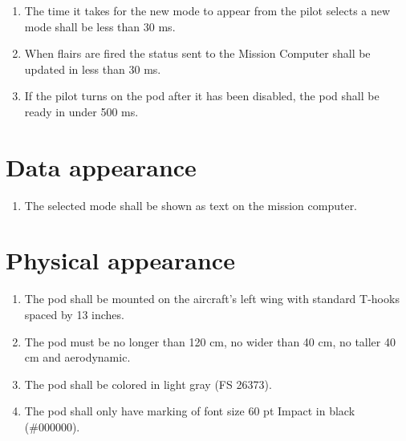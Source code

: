 \documentclass[Main]{subfiles}
\begin{document}
\begin{enumerate}[label= DDD-2.\arabic*:]

\item The time it takes for the new mode to appear from the pilot selects a new mode shall be less than 30 ms.\label{DDD-21}

\item When flairs are fired the status sent to the Mission Computer shall be updated in less than 30 ms.\label{DDD-22}

\item If the pilot turns on the pod after it has been disabled, the pod shall be ready in under 500 ms.\label{DDD-23}

\end{enumerate}




\section{Data appearance}

\begin{enumerate}[label= DDD-3.\arabic*:]

\item The selected mode shall be shown as text on the mission computer.\label{DDD-31}

\end{enumerate}



%
%
%




\section{Physical appearance}
\begin{enumerate}[label= DDD-4.\arabic*:]

\item The pod shall be mounted on the aircraft's left wing with standard T-hooks spaced by 13 inches.\label{DDD-41}

\item The pod must be no longer than 120 cm, no wider than 40 cm, no taller 40 cm and aerodynamic. \label{DDD-42}

\item The pod shall be colored in light gray (FS 26373).\label{DDD-43}

\item The pod shall only have marking of font size 60 pt Impact in black (\#000000).\label{DDD-44}

\end{enumerate}
\end{document}
